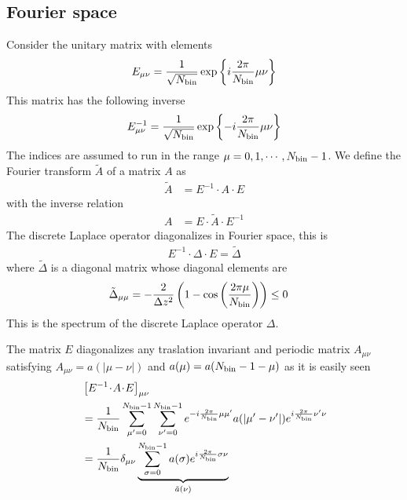 \documentclass[a4paper,openright,12pt]{book}
\newcommand{\esc}{\!\cdot\!}
\begin{document}
\subsection{Fourier space}
Consider the unitary matrix with elements
\begin{align}
E_{\mu\nu}=\frac{1}{\sqrt{N_{\rm bin}}}\exp\left\{i\frac{2\pi}{N_{\rm bin}}\mu\nu\right\}
\end{align} 
This matrix has the following inverse
\begin{align}
E^{-1}_{\mu\nu}=\frac{1}{\sqrt{N_{\rm bin}}}\exp\left\{-i\frac{2\pi}{N_{\rm bin}}\mu\nu\right\}
\end{align} 
The indices  are assumed  to run  in the  range $\mu=0,1,\cdots,N_{\rm
  bin}-1$.  
We define the Fourier transform $\tilde{A}$ of a matrix $A$ as
\begin{align}
    \tilde{A}&=E^{-1}\esc A\esc{E}
 \end{align}
with the inverse relation 
 \begin{align}
     A&=E\esc  \tilde{A}\esc{E}^{-1}
\label{FT}
\end{align}
The discrete Laplace operator diagonalizes in Fourier space, this is
\begin{align}
  E^{-1}  \esc {\Delta} \esc E= \tilde{\Delta}
\label{EDE}
\end{align}
where $\tilde{\Delta}$ is a diagonal matrix whose diagonal  elements are
\begin{align}
\tilde{\Delta}_{\mu\mu}&=-\frac{2}{\Delta z^2}
\left(1-\cos\left( \frac{2\pi \mu}{N_{\rm bin}}\right)\right)\le0  
\label{Dmumu}
\end{align}
This is the  spectrum of the discrete Laplace  operator $\Delta$. 


The matrix $E$ diagonalizes any traslation invariant and periodic
matrix    $A_{\mu\nu}$    satisfying    $A_{\mu\nu}=a(|\mu-\nu|)$    and
$a(\mu)=a(N_{\rm bin}-1-\mu)$ as it is easily seen
\begin{align}
&\left[  E^{-1}\esc A\esc E\right]_{\mu\nu}
\nonumber\\
&=
\frac{1}{N_{\rm bin}}\sum_{\mu'=0}^{N_{\rm bin}-1}\sum_{\nu'=0}^{N_{\rm bin}-1} e^{-i\frac{2\pi}{N_{\rm bin}}\mu\mu'}a(|\mu'-\nu'|)
e^{i\frac{2\pi}{N_{\rm bin}}\nu'\nu}
 \nonumber\\
&=\frac{1}{N_{\rm bin}}\delta_{\mu\nu}\underbrace{\sum_{\sigma=0}^{N_{\rm bin}-1}a(\sigma)e^{i\frac{2\pi}{N_{\rm bin}}\sigma\nu}}_{\tilde{a}(\nu)}
\end{align}
\end{document}
